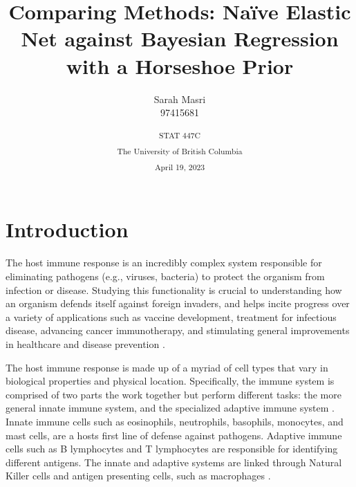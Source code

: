 \documentclass[
	a4paper, %
	10pt, %
	unnumberedsections, %
	twoside, %
]{LTJournalArticle}
\title{Comparing Methods: Naïve Elastic Net against Bayesian Regression with a Horseshoe Prior} %
\author{Sarah Masri \\ 97415681}
\date{\textsuperscript{STAT 447C} \\
\textsuperscript{The University of British Columbia} \\ 
\textsuperscript{April 19, 2023} }
\newcommand{\1}{\mathbbm{1}}
\begin{document}
\maketitle %


\section{Introduction}




The host immune response is an incredibly complex system responsible for eliminating pathogens (e.g., viruses, bacteria) to protect the organism from infection or disease. Studying this functionality is crucial to understanding how an organism defends itself against foreign invaders, and helps incite progress over a variety of applications such as vaccine development, treatment for infectious disease, advancing cancer immunotherapy, and stimulating general improvements in healthcare and disease prevention \cite{noauthor_undated}. 

The host immune response is made up of a myriad of cell types that vary in biological properties and physical location. Specifically, the immune system is comprised of two parts the work together but perform different tasks: the more general innate immune system, and the specialized adaptive immune system \cite{noauthor_2020}. Innate immune cells such as eosinophils, neutrophils, basophils, monocytes, and mast cells, are a hosts first line of defense against pathogens. Adaptive immune cells such as B lymphocytes and T lymphocytes are responsible for identifying different antigens. The innate and adaptive systems are linked through Natural Killer cells and antigen presenting cells, such as macrophages \cite{Torang2019}. 
\end{document}
